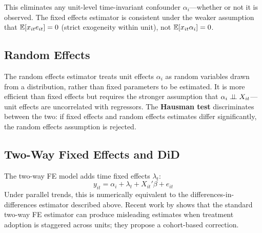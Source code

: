 This eliminates any unit-level time-invariant confounder
$\alpha_i$---whether or not it is observed. The fixed effects estimator is
consistent under the weaker assumption that $\mathbb{E}[x_{it}e_{it}] = 0$ (strict
exogeneity within unit), not $\mathbb{E}[x_{it}\alpha_i] = 0$.

\subsection{Random Effects}

The random effects estimator treats unit effects $\alpha_i$ as random
variables drawn from a distribution, rather than fixed parameters to be
estimated. It is more efficient than fixed effects but requires the stronger
assumption that $\alpha_i \perp\!\!\!\perp X_{it}$---unit effects are uncorrelated with
regressors. The \textbf{Hausman test} discriminates between the two:
if fixed effects and random effects estimates differ significantly, the random
effects assumption is rejected.

\subsection{Two-Way Fixed Effects and DiD}

The two-way FE model adds time fixed effects $\lambda_t$:
\begin{equation}
  y_{it} = \alpha_i + \lambda_t + X_{it}'\beta + e_{it}
\end{equation}
Under parallel trends, this is numerically equivalent to the
differences-in-differences estimator described above. Recent work by
\citet{Callaway2021} shows that the standard two-way FE estimator can produce
misleading estimates when treatment adoption is staggered across units; they
propose a cohort-based correction.


\renewcommand\bibname{Further reading}
\begin{subappendices}


\end{subappendices}
